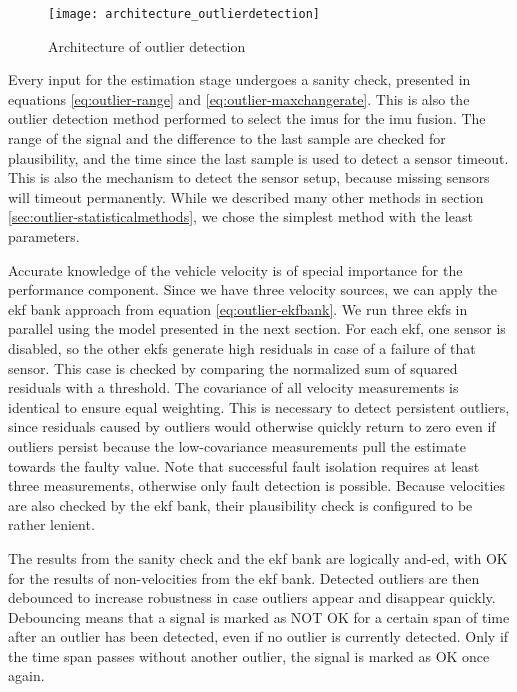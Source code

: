 \begin{figure}
	\centering
	\texttt{[image: architecture\_outlierdetection]}%
	\caption{Architecture of outlier detection}
	\label{fig:architecture-outlierdetection}
\end{figure}

Every input for the estimation stage undergoes a sanity check, presented in equations \ref{eq:outlier-range} and \ref{eq:outlier-maxchangerate}. This is also the outlier detection method performed to select the \glspl{imu} for the \gls{imu} fusion. The range of the signal and the difference to the last sample are checked for plausibility, and the time since the last sample is used to detect a sensor timeout. This is also the mechanism to detect the sensor setup, because missing sensors will timeout permanently. While we described many other methods in section \ref{sec:outlier-statisticalmethods}, we chose the simplest method with the least parameters.

Accurate knowledge of the vehicle velocity is of special importance for the performance component. Since we have three velocity sources, we can apply the \gls{ekf} bank approach from equation \ref{eq:outlier-ekfbank}. We run three \glspl{ekf} in parallel using the model presented in the next section. For each \gls{ekf}, one sensor is disabled, so the other \glspl{ekf} generate high residuals in case of a failure of that sensor. This case is checked by comparing the normalized sum of squared residuals with a threshold. The covariance of all velocity measurements is identical to ensure equal weighting. This is necessary to detect persistent outliers, since residuals caused by outliers would otherwise quickly return to zero even if outliers persist because the low-covariance measurements pull the estimate towards the faulty value. Note that successful fault isolation requires at least three measurements, otherwise only fault detection is possible. Because velocities are also checked by the \gls{ekf} bank, their plausibility check is configured to be rather lenient.

The results from the sanity check and the \gls{ekf} bank are logically and-ed, with OK for the results of non-velocities from the \gls{ekf} bank. Detected outliers are then debounced to increase robustness in case outliers appear and disappear quickly. Debouncing means that a signal is marked as NOT OK for a certain span of time after an outlier has been detected, even if no outlier is currently detected. Only if the time span passes without another outlier, the signal is marked as OK once again.

